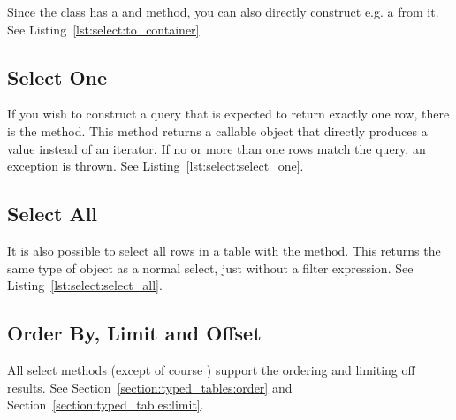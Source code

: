 Since the  class has a  and  method, you can also directly construct e.g. a  from it. See Listing~\ref{lst:select:to_container}.



\subsection{Select One}
\label{section:select:one}

If you wish to construct a query that is expected to return exactly one row, there is the  method. This method returns a callable object that directly produces a value instead of an iterator. If no or more than one rows match the query, an exception is thrown. See Listing~\ref{lst:select:select_one}.



\subsection{Select All}
\label{section:select:all}

It is also possible to select all rows in a table with the  method. This returns the same type of object as a normal select, just without a filter expression. See Listing~\ref{lst:select:select_all}.



\subsection{Order By, Limit and Offset}
\label{section:select:limit}

All select methods (except of course ) support the ordering and limiting off results. See Section~\ref{section:typed_tables:order} and Section~\ref{section:typed_tables:limit}.


